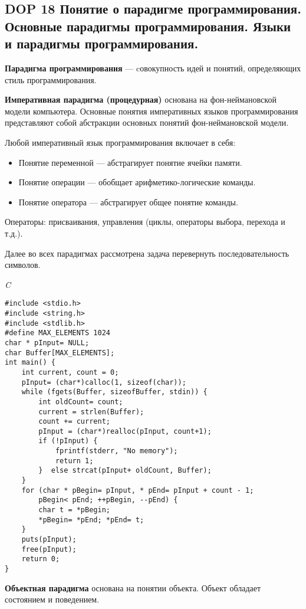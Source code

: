 \subsection{DOP 18 Понятие  о  парадигме  программирования.  Основные  парадигмы  программирования.  Языки  и  парадигмы программирования.}

\textbf{Парадигма программирования} --- cовокупность идей и понятий, определяющих стиль программирования.

\textbf{Императивная парадигма (процедурная)} основана на фон-неймановской модели компьютера. 
Основные понятия императивных языков программирования представляют собой абстракции основных понятий фон-неймановской модели. 

Любой императивный язык программирования включает в себя:
\begin{itemize}
    \item Понятие переменной --- абстрагирует понятие ячейки памяти.
    \item Понятие операции --- обобщает арифметико-логические команды.
    \item Понятие оператора --- абстрагирует общее понятие команды.
\end{itemize}

Операторы: присваивания, управления (циклы, операторы выбора, перехода и т.д.).

Далее во всех парадигмах рассмотрена задача перевернуть последовательность символов.

\textit{C}
\begin{lstlisting}[basicstyle=\ttfamily\small, frame=single] 
#include <stdio.h>
#include <string.h>
#include <stdlib.h>
#define MAX_ELEMENTS 1024
char * pInput= NULL;
char Buffer[MAX_ELEMENTS];
int main() {
    int current, count = 0;
    pInput= (char*)calloc(1, sizeof(char));
    while (fgets(Buffer, sizeofBuffer, stdin)) {
        int oldCount= count;
        current = strlen(Buffer);
        count += current;
        pInput = (char*)realloc(pInput, count+1);
        if (!pInput) {
            fprintf(stderr, "No memory");
            return 1;
        }  else strcat(pInput+ oldCount, Buffer);
    }
    for (char * pBegin= pInput, * pEnd= pInput + count - 1; 
        pBegin< pEnd; ++pBegin, --pEnd) {
        char t = *pBegin;
        *pBegin= *pEnd; *pEnd= t;
    }
    puts(pInput); 
    free(pInput);
    return 0;
}
    \end{lstlisting}
    
\bigbreak
\textbf{Объектная парадигма} основана на понятии объекта. 
Объект обладает состоянием и поведением.

